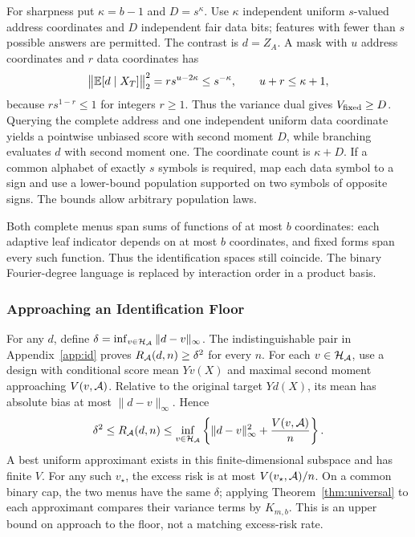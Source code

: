 For sharpness put $\kappa=b-1$ and $D=s^\kappa$. Use $\kappa$ independent uniform $s$-valued address coordinates and $D$ independent fair data bits; features with fewer than $s$ possible answers are permitted. The contrast is $d=Z_A$. A mask with $u$ address coordinates and $r$ data coordinates has
\[
 \big\|\mathbb{E}[d\mid X_T]\big\|_2^2=r s^{u-2\kappa}\le s^{-\kappa},\qquad u+r\le \kappa+1,
\]
because $r s^{1-r}\le1$ for integers $r\ge1$. Thus the variance dual gives $V_{\rm fixed}\ge D$. Querying the complete address and one independent uniform data coordinate yields a pointwise unbiased score with second moment $D$, while branching evaluates $d$ with second moment one. The coordinate count is $\kappa+D$. If a common alphabet of exactly $s$ symbols is required, map each data symbol to a sign and use a lower-bound population supported on two symbols of opposite signs. The bounds allow arbitrary population laws.

Both complete menus span sums of functions of at most $b$ coordinates: each adaptive leaf indicator depends on at most $b$ coordinates, and fixed forms span every such function. Thus the identification spaces still coincide. The binary Fourier-degree language is replaced by interaction order in a product basis.

\subsubsection{Approaching an Identification Floor}\label{app:floor-rate}
For any $d$, define $\delta=\inf_{v\in\mathcal H_\mathcal A}\|d-v\|_\infty$. The indistinguishable pair in Appendix~\ref{app:id} proves $R_\mathcal A(d,n)\ge\delta^2$ for every $n$. For each $v\in\mathcal H_\mathcal A$, use a design with conditional score mean $Yv(X)$ and maximal second moment approaching $V(v,\mathcal A)$. Relative to the original target $Yd(X)$, its mean has absolute bias at most $\|d-v\|_\infty$. Hence
\begin{equation}
 \delta^2\le R_\mathcal A(d,n)
 \le\inf_{v\in\mathcal H_\mathcal A}\left\{\|d-v\|_\infty^2+\frac{V(v,\mathcal A)}n\right\}.
 \label{eq:floor-envelope}
\end{equation}
A best uniform approximant exists in this finite-dimensional subspace and has finite $V$. For any such $v_\star$, the excess risk is at most $V(v_\star,\mathcal A)/n$. On a common binary cap, the two menus have the same $\delta$; applying Theorem~\ref{thm:universal} to each approximant compares their variance terms by $K_{m,b}$. This is an upper bound on approach to the floor, not a matching excess-risk rate.

